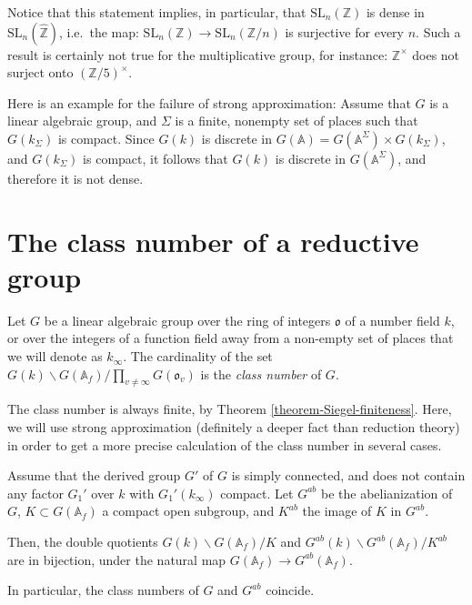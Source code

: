 Notice that this statement implies, in particular, that $\text{SL}_n(\mathbb Z)$ is dense in $\text{SL}_n(\widehat{\mathbb Z})$, i.e.\ the map: $\text{SL}_n(\mathbb Z)\to \text{SL}_n(\mathbb Z/n)$ is surjective for every $n$. Such a result is certainly not true for the multiplicative group, for instance: $\mathbb Z^\times$ does not surject onto $(\mathbb Z/5)^\times$.

\begin{example}
 \label{example-failure-strong-approximation}
Here is an example for the failure of strong approximation: Assume that $G$ is a linear algebraic group, and $\Sigma$ is a finite, nonempty set of places such that $G(k_\Sigma)$ is compact. Since $G(k)$ is discrete in $G(\mathbb A) = G(\mathbb A^\Sigma) \times G(k_\Sigma)$, and $G(k_\Sigma)$ is compact, it follows that $G(k)$ is discrete in  $G(\mathbb A^\Sigma)$, and therefore it is not dense.
\end{example}


\section{The class number of a reductive group}
\label{section-class-number}

\begin{definition}
 \label{definition-class-number}
 Let $G$ be a linear algebraic group over the ring of integers $\mathfrak o$ of a number field $k$, or over the integers of a function field away from a non-empty set of places that we will denote as $k_\infty$. The cardinality of the set $G(k)\backslash G(\mathbb A_f)/\prod_{v\ne \infty} G(\mathfrak o_v)$ is the {\it class number} of $G$. 
\end{definition}

The class number is always finite, by Theorem \ref{theorem-Siegel-finiteness}. Here, we will use strong approximation (definitely a deeper fact than reduction theory) in order to get a more precise calculation of the class number in several cases.

\begin{proposition}
\label{proposition-class-number-abelianization}
Assume that the derived group $G'$ of $G$ is simply connected, and does not contain any factor $G_1'$ over $k$ with $G_1'(k_\infty)$ compact. Let $G^{ab}$ be the abelianization of $G$, $K\subset G(\mathbb A_f)$ a compact open subgroup, and $K^{ab}$ the image of $K$ in $G^{ab}$. 

Then, the double quotients $G(k)\backslash G(\mathbb A_f)/K$ and $G^{ab}(k)\backslash G^{ab}(\mathbb A_f)/K^{ab}$ are in bijection, under the natural map $G(\mathbb A_f)\to G^{ab}(\mathbb A_f)$.

In particular, the class numbers of $G$ and $G^{ab}$ coincide.
\end{proposition}

